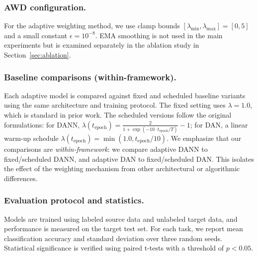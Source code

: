 \documentclass[pdflatex,sn-mathphys-num]{sn-jnl}
\theoremstyle{thmstyleone}
\theoremstyle{thmstyletwo}
\theoremstyle{thmstylethree}
\begin{document}
\subsubsection{AWD configuration.}
For the adaptive weighting method, we use clamp bounds $[\lambda_{\min}, \lambda_{\max}] = [0, 5]$ and a small constant $\epsilon = 10^{-8}$. EMA smoothing is not used in the main experiments but is examined separately in the ablation study in Section~\ref{sec:ablation}.

\subsubsection{Baseline comparisons (within-framework).}
Each adaptive model is compared against fixed and scheduled baseline variants using the same architecture and training protocol.
The fixed setting uses $\lambda = 1.0$, which is standard in prior work.
The scheduled versions follow the original formulations:
for DANN, $\lambda(t_{\text{epoch}}) = \frac{2}{1 + \exp(-10 \cdot t_{\text{epoch}} / T)} - 1$;
for DAN, a linear warm-up schedule $\lambda(t_{\text{epoch}}) = \min(1.0, t_{\text{epoch}}/10)$.
We emphasize that our comparisons are \emph{within-framework}: we compare adaptive DANN to fixed/scheduled DANN, and adaptive DAN to fixed/scheduled DAN. This isolates the effect of the weighting mechanism from other architectural or algorithmic differences.

\subsubsection{Evaluation protocol and statistics.}
Models are trained using labeled source data and unlabeled target data, and performance is measured on the target test set.
For each task, we report mean classification accuracy and standard deviation over three random seeds.
Statistical significance is verified using paired t-tests with a threshold of $p < 0.05$.
\end{document}
